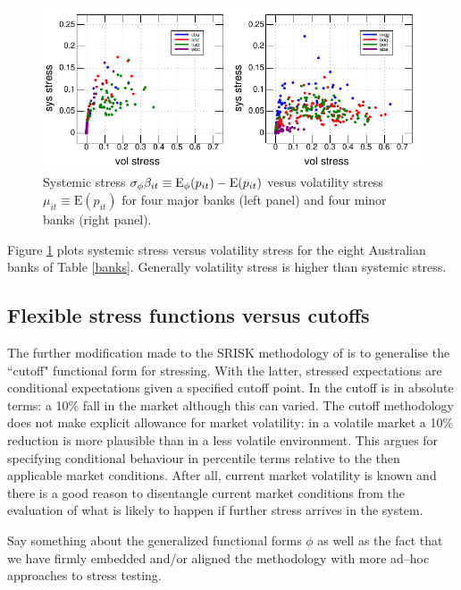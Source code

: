 \documentclass[authoryear]{elsarticle}
\newcommand{\E}{\mathrm{E}}
\newcommand{\fref}[1]{Figure \ref{#1}}
\newcommand{\tref}[1]{Table \ref{#1}}
\begin{document}
\begin{figure}[htbp]
\begin{center}
\includegraphics{sysstress.pdf}
\caption{Systemic stress $\sigma_\phi\beta_{it}\equiv \Es(p_{it})-\E(p_{it})$  vesus volatility stress  $\mu_{it}\equiv\E(p_{it})$   for four major banks (left panel) and four minor banks (right panel).}
\label{sysstress}
\end{center}
\end{figure}

\fref{sysstress} plots systemic stress versus volatility stress for the eight Australian banks of \tref{banks}.   Generally volatility stress is higher than systemic stress.

\subsection{Flexible  stress  functions versus cutoffs}

The further modification made to the SRISK methodology of \cite{brownlees2015} is to generalise the ``cutoff" functional form for stressing.   With the latter, stressed expectations are conditional expectations given a specified cutoff point.    In \cite{brownlees2015} the cutoff is in absolute terms:  a 10\% fall in the market although this can varied.   The cutoff methodology does not make explicit allowance for market volatility:  in a  volatile market a 10\% reduction is  more plausible than in a less volatile environment.  This argues for specifying conditional behaviour in percentile terms relative to the then applicable market conditions.  After all, current market volatility is known and there is a good reason to disentangle current market conditions from the evaluation of what is likely to happen if further stress arrives in the system.

Say something about the generalized functional forms $\phi$ as well as the fact that we have firmly embedded and/or aligned the methodology with more ad--hoc approaches to stress testing.
  
\end{document}
